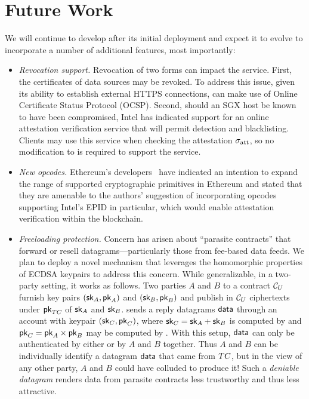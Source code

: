 \section{Future Work}

We will continue to develop \tc after its initial deployment and expect it to evolve to incorporate a number of additional features, most importantly:

\begin{itemize}
\item{\em Revocation support.} Revocation of two forms can impact the \tc service. First, the certificates of data sources may be revoked. To address this issue, given its ability to establish external HTTPS connections, \tc can make use of Online Certificate Status Protocol (OCSP). Second, should an SGX host be known to have been compromised, Intel has indicated support for an online attestation verification service that will permit detection and blacklisting. Clients may use this service when checking the attestation ${\sigma_{\textrm{att}}}$, so no modification to \tc is required to support the service.
\item{\em New opcodes.} Ethereum's developers~\cite{Buterinpersonal} have indicated an intention to expand the range of supported cryptographic primitives in Ethereum and stated that they are amenable to the authors' suggestion of incorporating opcodes supporting Intel's EPID in particular, which would enable attestation verification within the blockchain. 
\item{\em Freeloading protection.} Concern has arisen about ``parasite contracts'' that forward or resell datagrams---particularly those from fee-based data feeds. We plan to deploy a novel mechanism that leverages the homomorphic properties of ECDSA keypairs to address this concern. While generalizable, in a two-party setting, it works as follows. Two parties $A$ and $B$ to a contract ${\cal C}_U$ furnish key pairs $({\sf sk}_A, {\sf pk}_A)$ and $({\sf sk}_B, {\sf pk}_B)$ and publish in ${\cal C}_U$ ciphertexts under ${\sf pk}_{TC}$ of ${\sf sk}_A$ and ${\sf sk}_B$. \tc sends a reply datagrams ${\sf data}$ through an account with keypair $({\sf sk}_C, {\sf pk}_C)$, where ${\sf sk}_C = {\sf sk}_A + {\sf sk}_B$ is computed by \tc and ${\sf pk}_C = {\sf pk}_A \times {\sf pk}_B$ may be computed by \reqcont. With this setup, ${\sf data}$ can only be authenticated by either \tc or by $A$ and $B$ together. Thus $A$ and $B$ can be individually identify a datagram ${\sf data}$ that came from $TC$, but in the view of any other party, $A$ and $B$ could have colluded to produce it! Such a \emph{deniable datagram} renders data from parasite contracts less trustworthy and thus less attractive. 

\end{itemize}
